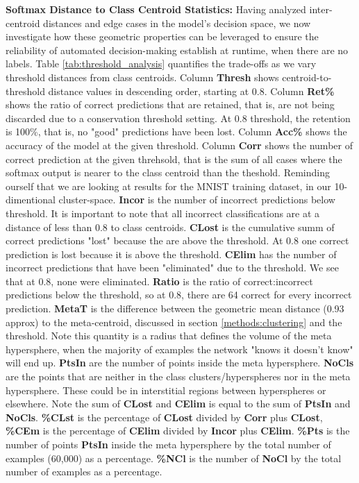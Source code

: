 \noindent \textbf{Softmax Distance to Class Centroid Statistics:} Having analyzed inter-centroid distances and edge cases in the model's decision space, we now investigate how these geometric properties can be leveraged to ensure the reliability of automated decision-making establish at runtime, when there are no labels. Table \ref{tab:threshold_analysis} quantifies the trade-offs as we vary threshold distances from class centroids. Column \textbf{Thresh} shows centroid-to-threshold distance values in descending order, starting at 0.8. Column \textbf{Ret\%} shows the ratio of correct predictions that are retained, that is, are not being discarded due to a conservation threshold setting. At 0.8 threshold, the retention is 100\%, that is, no "good" predictions have been lost. Column \textbf{Acc\%} shows the accuracy of the model at the given threshold. Column \textbf{Corr} shows the number of correct prediction at the given threhsold, that is the sum of all cases where the softmax output is nearer to the class centroid than the theshold. Reminding ourself that we are looking at results for the MNIST training dataset, in our 10-dimentional cluster-space. \textbf{Incor} is the number of incorrect predictions below threshold. It is important to note that all incorrect classifications are at a distance of less than 0.8 to class centroids. \textbf{CLost} is the cumulative summ of correct predictions "lost" because the are above the threshold. At 0.8 one correct prediction is lost because it is above the threshold. \textbf{CElim} has the number of incorrect predictions that have been "eliminated" due to the threshold. We see that at 0.8, none were eliminated. \textbf{Ratio} is the ratio of correct:incorrect predictions below the threshold, so at 0.8, there are 64 correct for every incorrect prediction. \textbf{MetaT} is the difference between the geometric mean distance (0.93 approx) to the meta-centroid, discussed in section \ref{methods:clustering} and the threshold. Note this quantity is a radius that defines the volume of the meta hypersphere, when the majority of examples the network "knows it doesn't know" will end up. \textbf{PtsIn} are the number of points inside the meta hypersphere. \textbf{NoCls} are the points that are neither in the class clusters/hyperspheres nor in the meta hypersphere. These could be in interstitial regions between hyperspheres or elsewhere. Note the sum of \textbf{CLost} and \textbf{CElim} is equal to the sum of \textbf{PtsIn} and \textbf{NoCls}. \textbf{\%CLst} is the percentage of \textbf{CLost} divided by \textbf{Corr} plus \textbf{CLost}, \textbf{\%CEm} is the percentage of \textbf{CElim} divided by \textbf{Incor} plus \textbf{CElim}. \textbf{\%Pts} is the number of points \textbf{PtsIn} inside the meta hypersphere by the total number of examples (60,000) as a percentage. \textbf{\%NCl} is the number of \textbf{NoCl} by the total number of examples as a percentage.

